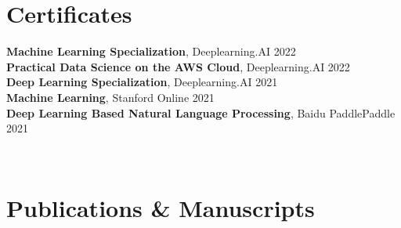 \documentclass[letterpaper,11pt]{article}
\newcommand{\resumeSubHeadingListStart}{\begin{itemize}[leftmargin=0.15in, label={}]}
\newcommand{\resumeSubHeadingListEnd}{\end{itemize}}
\begin{document}
\section{Certificates}
  \resumeSubHeadingListStart
    \small{\item{
        \textbf{Machine Learning Specialization}, Deeplearning.AI \hfill 2022 \\ \vspace{1pt}
        \textbf{Practical Data Science on the AWS Cloud}, Deeplearning.AI \hfill 2022 \\ \vspace{1pt}
        \textbf{Deep Learning Specialization}, Deeplearning.AI \hfill 2021 \\ \vspace{1pt}
        \textbf{Machine Learning}, Stanford Online \hfill 2021 \\ \vspace{1pt}
        \textbf{Deep Learning Based Natural Language Processing}, Baidu PaddlePaddle \hfill 2021
    }} \\ \vspace{-5pt}
  \resumeSubHeadingListEnd
 


\section{Publications \& Manuscripts}
\end{document}

